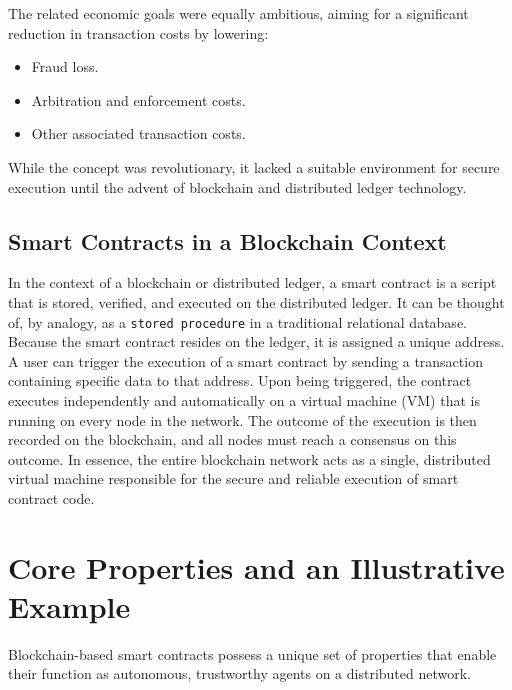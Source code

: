 \documentclass{scrbook}
\begin{document}
The related economic goals were equally ambitious, aiming for a significant reduction in transaction costs by lowering:

\begin{itemize}
    \item Fraud loss.
    \item Arbitration and enforcement costs.
    \item Other associated transaction costs.
\end{itemize}

While the concept was revolutionary, it lacked a suitable environment for secure execution until the advent of blockchain and distributed ledger technology.

\section{Smart Contracts in a Blockchain Context}

In the context of a blockchain or distributed ledger, a smart contract is a script that is stored, verified, and executed on the distributed ledger. It can be thought of, by analogy, as a \texttt{stored procedure} in a traditional relational database.\\

Because the smart contract resides on the ledger, it is assigned a unique address. A user can trigger the execution of a smart contract by sending a transaction containing specific data to that address. Upon being triggered, the contract executes independently and automatically on a virtual machine (VM) that is running on every node in the network. The outcome of the execution is then recorded on the blockchain, and all nodes must reach a consensus on this outcome. In essence, the entire blockchain network acts as a single, distributed virtual machine responsible for the secure and reliable execution of smart contract code.

\chapter{Core Properties and an Illustrative Example}

Blockchain-based smart contracts possess a unique set of properties that enable their function as autonomous, trustworthy agents on a distributed network.
\end{document}
